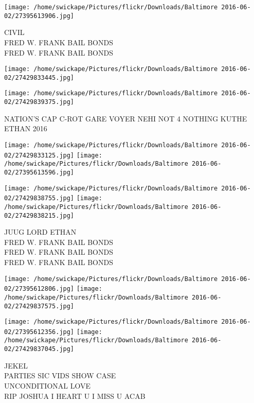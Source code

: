 \documentclass[10pt,letterpaper]{article}
\begin{document}
\vspace{0.25in}
\texttt{[image: /home/swickape/Pictures/flickr/Downloads/Baltimore 2016-06-02/27395613906.jpg]}

CIVIL\\
FRED W. FRANK BAIL BONDS\\
FRED W. FRANK BAIL BONDS\\
\pagebreak

\texttt{[image: /home/swickape/Pictures/flickr/Downloads/Baltimore 2016-06-02/27429833445.jpg]}

\vspace{0.25in}
\texttt{[image: /home/swickape/Pictures/flickr/Downloads/Baltimore 2016-06-02/27429839375.jpg]}

NATION'S CAP C{-}ROT GARE VOYER NEHI NOT 4 NOTHING KUTHE\\
ETHAN 2016\\
\pagebreak

\texttt{[image: /home/swickape/Pictures/flickr/Downloads/Baltimore 2016-06-02/27429833125.jpg]}
\texttt{[image: /home/swickape/Pictures/flickr/Downloads/Baltimore 2016-06-02/27395613596.jpg]}

\texttt{[image: /home/swickape/Pictures/flickr/Downloads/Baltimore 2016-06-02/27429838755.jpg]}
\texttt{[image: /home/swickape/Pictures/flickr/Downloads/Baltimore 2016-06-02/27429838215.jpg]}

JUUG LORD ETHAN\\
FRED W. FRANK BAIL BONDS\\
FRED W. FRANK BAIL BONDS\\
FRED W. FRANK BAIL BONDS\\
\pagebreak

\texttt{[image: /home/swickape/Pictures/flickr/Downloads/Baltimore 2016-06-02/27395612806.jpg]}
\texttt{[image: /home/swickape/Pictures/flickr/Downloads/Baltimore 2016-06-02/27429837575.jpg]}

\texttt{[image: /home/swickape/Pictures/flickr/Downloads/Baltimore 2016-06-02/27395612356.jpg]}
\texttt{[image: /home/swickape/Pictures/flickr/Downloads/Baltimore 2016-06-02/27429837045.jpg]}

JEKEL\\
PARTIES SIC VIDS SHOW CASE\\
UNCONDITIONAL LOVE\\
RIP JOSHUA I HEART U I MISS U ACAB\\
\pagebreak
\end{document}

